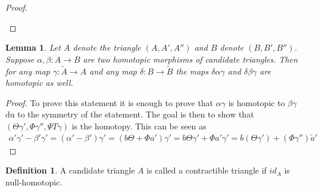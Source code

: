 \documentclass[11pt]{article}
\newtheorem{lemma}[theorem]{Lemma}
\theoremstyle{definition}
\newtheorem{definition}{Definition}[section]
\theoremstyle{remark}
\begin{document}
\begin{proof}
\begin{center}
                \end{center}
            \end{proof}

            \begin{lemma}
                Let $A$ denote the triangle $(A,A',A'')$ and $B$ denote $(B,B',B'')$. Suppose $\alpha, \beta : A \rightarrow B$ are two homotopic morphisms of candidate triangles. Then for any map $\gamma : \widetilde{A} \rightarrow A$ and any map $\delta : B \rightarrow \widetilde{B}$ the maps $\delta\alpha\gamma$ and $\delta\beta\gamma$ are homotopic as well.
            \end{lemma}

            \begin{proof}
                To prove this statement it is enough to prove that $\alpha\gamma$ is homotopic to $\beta\gamma$ du to the symmetry of the statement. The goal is then to show that $(\Theta\gamma ',\Phi\gamma '',\Psi T\gamma)$ is the homotopy. This can be seen as
                \begin{multline*}
                    {\alpha}'{\gamma}'-{\beta}'{\gamma}' = ({\alpha}'-{\beta}'){\gamma}' = (b\Theta +\Phi a'){\gamma}' = b\Theta {\gamma}' + \Phi a'{\gamma}' = b({\Theta}{\gamma}') + ({\Phi}{\gamma}'')\widetilde{a}'
                \end{multline*}
            \end{proof}

            \begin{definition}
                A candidate triangle $A$ is called a contractible triangle if $id_A$ is null-homotopic.
            \end{definition}
\end{document}
